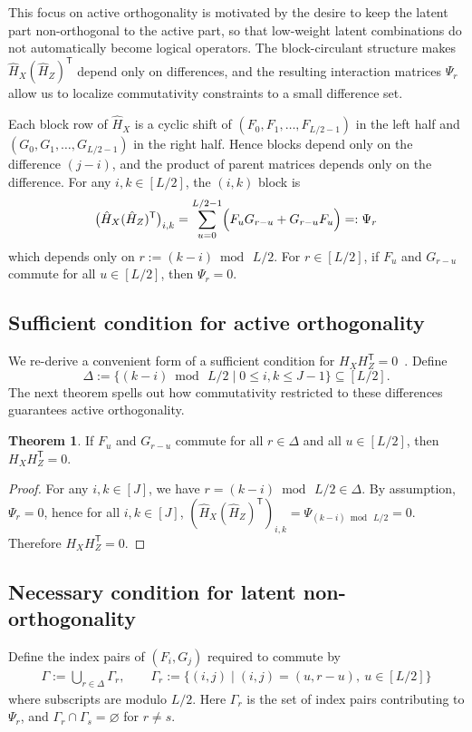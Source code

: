 \documentclass[a4paper,onecolumn,11pt,accepted=2026-08-03]{quantumarticle}
\newcommand{\idxLtwo}{[L/2]}
\newcommand{\Hful}{\hat{H}}
\renewcommand\[{\begin{equation}}
\renewcommand\]{\end{equation}}
\theoremstyle{definition}
\newtheorem{theorem}{Theorem}[section]
\begin{document}
This focus on active orthogonality is motivated by the desire to keep the latent part non-orthogonal to the active part, so that low-weight latent combinations do not automatically become logical operators. The block-circulant structure makes $\Hful_X(\Hful_Z)^{\mathsf T}$ depend only on differences, and the resulting interaction matrices $\Psi_r$ allow us to localize commutativity constraints to a small difference set.

Each block row of $\Hful_X$ is a cyclic shift of $(F_0,F_1,\dots,F_{L/2-1})$ in the left half and $(G_0,G_1,\dots,G_{L/2-1})$ in the right half. Hence blocks depend only on the difference $(j-i)$, and the product of parent matrices depends only on the difference. For any $i,k\in[L/2]$, the $(i,k)$ block is
\[
\bigl(\Hful_X(\Hful_Z)^{\mathsf T}\bigr)_{i,k}=\sum_{u=0}^{L/2-1}\Bigl(F_uG_{r-u}+G_{r-u}F_u\Bigr)=:\Psi_r
\]
which depends only on $r:=(k-i)\bmod\, L/2$. For $r\in\idxLtwo$, if $F_u$ and $G_{r-u}$ commute for all $u\in\idxLtwo$, then $\Psi_r=0$.

\subsection{Sufficient condition for active orthogonality}
We re-derive a convenient form of a sufficient condition for $H_XH_Z^{\mathsf T}=0$~\cite{Kasai2025Hashing}. Define
\[
\Delta:=\{(k-i)\bmod\, L/2\mid 0\le i,k\le J-1\}\subseteq[L/2].
\]
The next theorem spells out how commutativity restricted to these differences guarantees active orthogonality.
\begin{theorem}
\label{thm:active-orthogonality}
If $F_u$ and $G_{r-u}$ commute for all $r\in\Delta$ and all $u\in[L/2]$, then $H_XH_Z^{\mathsf T}=0$.
\end{theorem}
\begin{proof}
For any $i,k\in[J]$, we have $r=(k-i)\bmod\, L/2\in\Delta$. By assumption, $\Psi_r=0$, hence for all $i,k\in[J]$,
\(
(\Hful_X(\Hful_Z)^{\mathsf T})_{i,k}=\Psi_{(k-i)\bmod\, L/2}=0.
\)
Therefore $H_XH_Z^{\mathsf T}=0$.
\end{proof}

\subsection{Necessary condition for latent non-orthogonality}
Define the index pairs of $(F_i,G_j)$ required to commute by
\begin{align*}
\Gamma :=\bigcup_{r\in \Delta}\Gamma_r,\qquad \Gamma_r :=\{(i,j)\mid (i,j)=(u,r-u),\ u\in[L/2]\}
\end{align*}
where subscripts are modulo $L/2$. 
Here $\Gamma_r$ is the set of index pairs contributing to $\Psi_r$, and $\Gamma_r\cap\Gamma_s=\varnothing$ for $r\neq s$.
\end{document}
